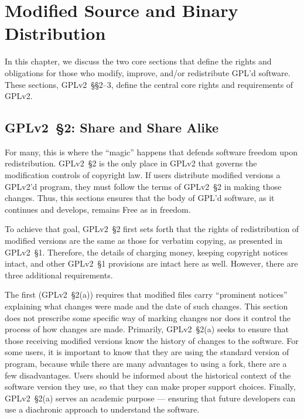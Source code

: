 \chapter{Modified Source and Binary Distribution}
\label{source-and-binary}

In this chapter, we discuss the two core sections that define the rights
and obligations for those who modify, improve, and/or redistribute GPL'd
software. These sections, GPLv2~\S\S2--3, define the central core rights and
requirements of GPLv2\@.

\section{GPLv2~\S2: Share and Share Alike}
\label{GPLv2s2}

For many, this is where the ``magic'' happens that defends software
freedom upon redistribution.  GPLv2~\S2 is the only place in GPLv2
that governs the modification controls of copyright law.  If users
distribute modified versions a GPLv2'd program, they must follow the terms of GPLv2~\S2 in making
those changes.  Thus, this sections ensures that the body of GPL'd software, as it
continues and develops, remains Free as in freedom.

To achieve that goal, GPLv2~\S2 first sets forth that the rights of
redistribution of modified versions are the same as those for verbatim
copying, as presented in GPLv2~\S1.  Therefore, the details of charging money,
keeping copyright notices intact, and other GPLv2~\S1 provisions are intact
here as well.  However, there are three additional requirements.

The first (GPLv2~\S2(a)) requires that modified files carry ``prominent
notices'' explaining what changes were made and the date of such
changes. This section does not prescribe some specific way of
marking changes nor does it control the process of how changes are made.
Primarily, GPLv2~\S2(a) seeks to ensure that those receiving modified
versions know the history of changes to the software.  For some users,
it is important to know that they are using the standard version of
program, because while there are many advantages to using a fork,
there are a few disadvantages.  Users should be informed about the
historical context of the software version they use, so that they can
make proper support choices.  Finally, GPLv2~\S2(a) serves an academic
purpose --- ensuring that future developers can use a diachronic
approach to understand the software.

